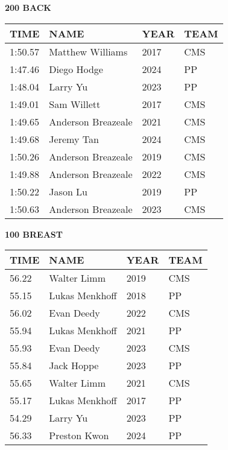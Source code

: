 \vspace{0.4cm}

\begin{minipage}[t]{0.48\textwidth}
\centering
\textbf{200 BACK}\\[0.05cm]
\begin{tabular}{@{}p{1.8cm}p{2.8cm}p{1.2cm}p{1.4cm}@{}}
\hline
\textbf{TIME} & \textbf{NAME} & \textbf{YEAR} & \textbf{TEAM} \\
\hline
1:50.57 & Matthew Williams & 2017 & CMS \\
1:47.46 & Diego Hodge & 2024 & PP \\
1:48.04 & Larry Yu & 2023 & PP \\
1:49.01 & Sam Willett & 2017 & CMS \\
1:49.65 & Anderson Breazeale & 2021 & CMS \\
1:49.68 & Jeremy Tan & 2024 & CMS \\
1:50.26 & Anderson Breazeale & 2019 & CMS \\
1:49.88 & Anderson Breazeale & 2022 & CMS \\
1:50.22 & Jason Lu & 2019 & PP \\
1:50.63 & Anderson Breazeale & 2023 & CMS \\
\hline
\end{tabular}
\end{minipage}\hfill
\begin{minipage}[t]{0.48\textwidth}
\centering
\textbf{100 BREAST}\\[0.05cm]
\begin{tabular}{@{}p{1.8cm}p{2.8cm}p{1.2cm}p{1.4cm}@{}}
\hline
\textbf{TIME} & \textbf{NAME} & \textbf{YEAR} & \textbf{TEAM} \\
\hline
56.22 & Walter Limm & 2019 & CMS \\
55.15 & Lukas Menkhoff & 2018 & PP \\
56.02 & Evan Deedy & 2022 & CMS \\
55.94 & Lukas Menkhoff & 2021 & PP \\
55.93 & Evan Deedy & 2023 & CMS \\
55.84 & Jack Hoppe & 2023 & PP \\
55.65 & Walter Limm & 2021 & CMS \\
55.17 & Lukas Menkhoff & 2017 & PP \\
54.29 & Larry Yu & 2023 & PP \\
56.33 & Preston Kwon & 2024 & PP \\
\hline
\end{tabular}
\end{minipage}

